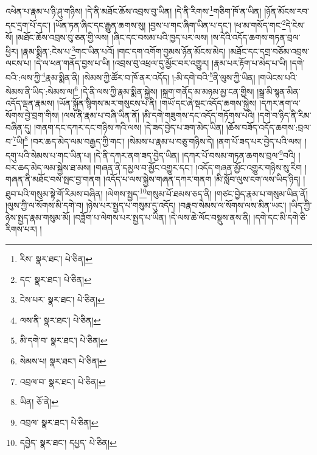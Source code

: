 འཕེན་པ་རྣམ་པ་ཉི་ཤུ་གཉིས། །དེ་ནི་མཐོང་ཆོས་འབྲས་བུ་ཡིན། །དེ་ནི་རིགས་\footnote{རིས་  སྣར་ཐང་།  པེ་ཅིན། }གཅིག་ཁོ་ན་ཡིན། །ཉོན་མོངས་རབ་དང་དྲག་པོ་དང་། །ཡོན་ཏན་ཞིང་དང་རྒྱུན་ཆགས་སུ། །བྱས་པ་གང་ཞིག་ཡིན་པ་དང་། །ཕ་མ་གསོད་གང་\footnote{དང་  སྣར་ཐང་།  པེ་ཅིན། }དེ་ངེས་སོ། །མཐོང་ཆོས་འབྲས་བུ་ཅན་གྱི་ལས། །ཞིང་དང་བསམ་པའི་ཁྱད་པར་ལས། །ས་དེའི་འདོད་ཆགས་གཏན་བྲལ་ཕྱིར། །རྣམ་སྨིན་:ངེས་པ་\footnote{ངེས་པར་  སྣར་ཐང་།  པེ་ཅིན། }གང་ཡིན་པའོ། །གང་དག་འགོག་བྱམས་ཉོན་མོངས་མེད། །མཐོང་དང་དགྲ་བཅོམ་འབྲས་ལངས་པ། །དེ་ལ་ཕན་གནོད་བྱས་པ་ཡི། །འབྲས་བུ་འཕྲལ་དུ་མྱོང་བར་འགྱུར། །རྣམ་པར་རྟོག་པ་མེད་པ་ཡི། །དགེ་བའི་:ལས་ཀྱི་\footnote{ལས་ནི་  སྣར་ཐང་།  པེ་ཅིན། }རྣམ་སྨིན་ནི། །སེམས་ཀྱི་ཚོར་བ་ཁོ་ནར་འདོད། །:མི་དགེ་བའི་\footnote{མི་དགེ་བ་  སྣར་ཐང་།  པེ་ཅིན། }ནི་ལུས་ཀྱི་ཡིན། །གཡེངས་པའི་སེམས་ནི་ཡིད་:སེམས་ལ།\footnote{སེམས་པ།  སྣར་ཐང་།  པེ་ཅིན། } །དེ་ནི་ལས་ཀྱི་རྣམ་སྨིན་སྐྱེས། །སྐྲག་གནོད་མ་མཉམ་མྱ་ངན་གྱིས། །སྒྲ་མི་སྙན་མིན་འདོད་ལྡན་རྣམས། །ཡོན་སྐྱོན་སྙིགས་མར་གསུངས་པ་ནི། །གཡོ་དང་ཞེ་སྡང་འདོད་ཆགས་སྐྱེས། །དཀར་ནག་ལ་སོགས་བྱེ་བྲག་གིས། །ལས་ནི་རྣམ་པ་བཞི་ཡིན་ནོ། །མི་དགེ་གཟུགས་དང་འདོད་གཏོགས་པའི། །དགེ་བ་ཉིད་ནི་རིམ་བཞིན་དུ། །གནག་དང་དཀར་དང་གཉིས་ཀའི་ལས། །དེ་ཟད་བྱེད་པ་ཟག་མེད་ཡིན། །ཆོས་བཟོད་འདོད་ཆགས་:བྲལ་བ་\footnote{འབྲལ་བ་  སྣར་ཐང་།  པེ་ཅིན། }ཡི།\footnote{ཡིན།  ཅོ་ནེ། } །བར་ཆད་མེད་ལམ་བརྒྱད་ཀྱི་གང་། །སེམས་པ་རྣམ་པ་བཅུ་གཉིས་དེ། །ནག་པོ་ཟད་པར་བྱེད་པའི་ལས། །དགུ་པའི་སེམས་པ་གང་ཡིན་པ། །དེ་ནི་དཀར་ནག་ཟད་བྱེད་ཡིན། །དཀར་པོ་བསམ་གཏན་ཆགས་བྲལ་\footnote{འབྲལ་  སྣར་ཐང་།  པེ་ཅིན། }བའི། །བར་ཆད་མེད་ལམ་སྐྱེས་ཐ་མས། །གཞན་ནི་དམྱལ་བ་མྱོང་འགྱུར་དང་། །འདོད་གཞན་མྱོང་འགྱུར་གཉིས་སུ་རིག །གཞན་ནི་མཐོང་བས་སྤང་བྱ་གནག །འདོད་པ་ལས་སྐྱེས་གཞན་དཀར་གནག །མི་སློབ་ལུས་ངག་ལས་ཡིད་ཉིད། །ཐུབ་པའི་གསུམ་སྟེ་གོ་རིམས་བཞིན། །ལེགས་སྤྱད་\footnote{དབྱེད་  སྣར་ཐང་། དཔྱད་  པེ་ཅིན། }གསུམ་པོ་ཐམས་ཅད་ནི། །གཙང་བྱེད་རྣམ་པ་གསུམ་ཡིན་ནོ། །ལུས་ཀྱི་ལ་སོགས་མི་དགེ་བ། །ཉེས་པར་སྤྱད་པ་གསུམ་དུ་འདོད། །བརྣབ་སེམས་ལ་སོགས་ལས་མིན་ཡང་། །ཡིད་ཀྱི་ཉེས་སྤྱད་རྣམ་གསུམ་མོ། །བཟློག་པ་ལེགས་པར་སྤྱད་པ་ཡིན། །དེ་ལས་ཆེ་ལོང་བསྡུས་ནས་ནི། །དགེ་དང་མི་དགེ་ཅི་རིགས་པར། །
